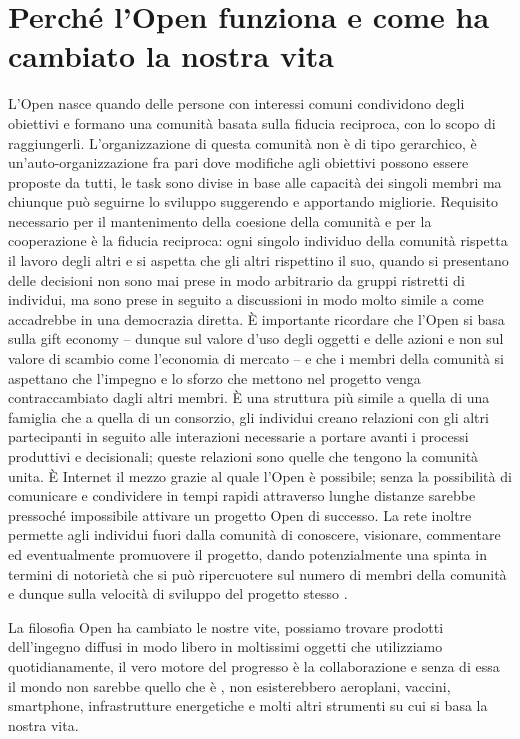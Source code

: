 \chapter{Perché l’Open funziona e come ha cambiato la nostra vita}

L’Open nasce quando delle persone con interessi comuni condividono degli obiettivi e
formano una comunità basata sulla fiducia reciproca, con lo scopo di raggiungerli.
L’organizzazione di questa comunità non è di tipo gerarchico, è un’auto-organizzazione fra
pari dove modifiche agli obiettivi possono essere proposte da tutti, le task sono divise in
base alle capacità dei singoli membri ma chiunque può seguirne lo sviluppo suggerendo e
apportando migliorie. Requisito necessario per il mantenimento della coesione della
comunità e per la cooperazione è la fiducia reciproca: ogni singolo individuo della comunità
rispetta il lavoro degli altri e si aspetta che gli altri rispettino il suo, quando si presentano
delle decisioni non sono mai prese in modo arbitrario da gruppi ristretti di individui, ma sono
prese in seguito a discussioni in modo molto simile a come accadrebbe in una democrazia
diretta. È importante ricordare che l’Open si basa sulla gift economy – dunque sul valore
d’uso degli oggetti e delle azioni e non sul valore di scambio come l’economia di mercato –
e che i membri della comunità si aspettano che l’impegno e lo sforzo che mettono nel
progetto venga contraccambiato dagli altri membri. È una struttura più simile a quella di una
famiglia che a quella di un consorzio, gli individui creano relazioni con gli altri partecipanti in
seguito alle interazioni necessarie a portare avanti i processi produttivi e decisionali; queste
relazioni sono quelle che tengono la comunità unita. È Internet il mezzo grazie al quale l’Open
è possibile; senza la possibilità di comunicare e condividere in tempi rapidi attraverso lunghe
distanze sarebbe pressoché impossibile attivare un progetto Open di successo. La rete
inoltre permette agli individui fuori dalla comunità di conoscere, visionare, commentare ed
eventualmente promuovere il progetto, dando potenzialmente una spinta in termini di
notorietà che si può ripercuotere sul numero di membri della comunità e dunque sulla
velocità di sviluppo del progetto stesso \parencite{goldman}.

La filosofia Open ha cambiato le nostre vite, possiamo trovare prodotti dell’ingegno
diffusi in modo libero in moltissimi oggetti che utilizziamo quotidianamente, il vero motore
del progresso è la collaborazione e senza di essa il mondo non sarebbe quello che è \parencite{yeaton},
non esisterebbero aeroplani, vaccini, smartphone, infrastrutture energetiche e molti
altri strumenti su cui si basa la nostra vita.